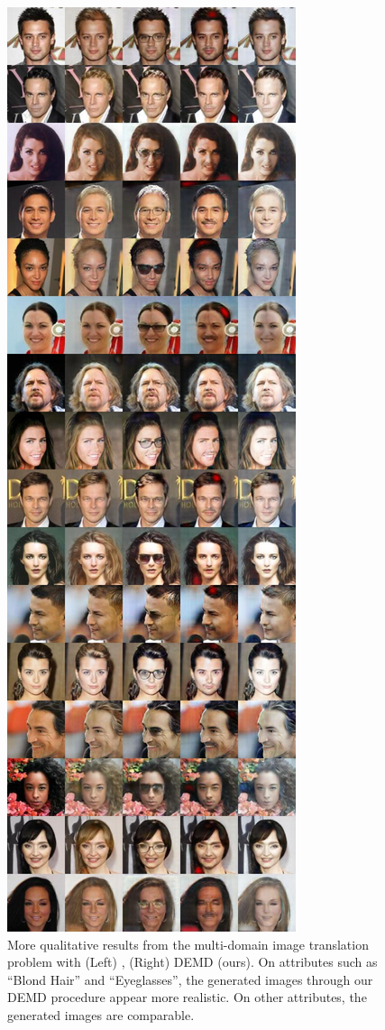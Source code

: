 \begin{figure}
    \includegraphics[height=0.85\textheight]{6_demd/figs/mwgan_res/demd-00001-images.jpg}
    \caption[Additional qualitative translation results 1]{More qualitative results from the multi-domain image translation problem with (Left) \cite{cao2019multi}, (Right) DEMD (ours). On attributes such as ``Blond Hair'' and ``Eyeglasses'', the generated images through our DEMD procedure appear more realistic. On other attributes, the generated images are comparable. }
    \label{fig:moreganres1}
\end{figure}

